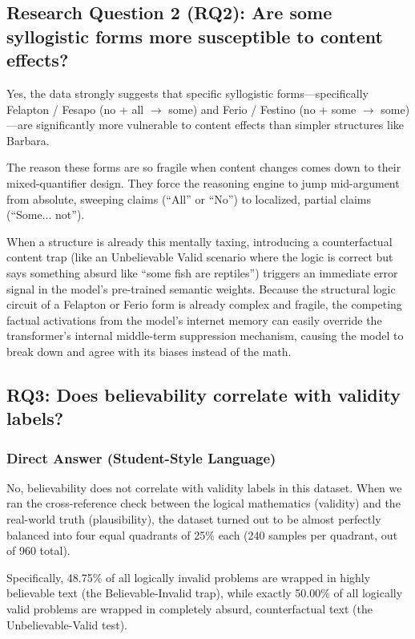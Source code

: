 \documentclass[11pt]{article}
\begin{document}
\subsection{Research Question 2 (RQ2): Are some syllogistic forms more susceptible to content effects?}
Yes, the data strongly suggests that specific syllogistic forms---specifically Felapton / Fesapo (no + all $\rightarrow$ some) and Ferio / Festino (no + some $\rightarrow$ some)---are significantly more vulnerable to content effects than simpler structures like Barbara.

The reason these forms are so fragile when content changes comes down to their mixed-quantifier design. They force the reasoning engine to jump mid-argument from absolute, sweeping claims (``All'' or ``No'') to localized, partial claims (``Some... not'').

When a structure is already this mentally taxing, introducing a counterfactual content trap (like an Unbelievable Valid scenario where the logic is correct but says something absurd like ``some fish are reptiles'') triggers an immediate error signal in the model's pre-trained semantic weights. Because the structural logic circuit of a Felapton or Ferio form is already complex and fragile, the competing factual activations from the model's internet memory can easily override the transformer's internal middle-term suppression mechanism, causing the model to break down and agree with its biases instead of the math.

\subsection{RQ3: Does believability correlate with validity labels?}

\subsubsection*{Direct Answer (Student-Style Language)}
No, believability does not correlate with validity labels in this dataset. When we ran the cross-reference check between the logical mathematics (validity) and the real-world truth (plausibility), the dataset turned out to be almost perfectly balanced into four equal quadrants of 25\% each (240 samples per quadrant, out of 960 total).

Specifically, 48.75\% of all logically invalid problems are wrapped in highly believable text (the Believable-Invalid trap), while exactly 50.00\% of all logically valid problems are wrapped in completely absurd, counterfactual text (the Unbelievable-Valid test).
\end{document}
